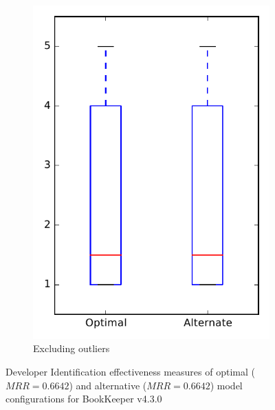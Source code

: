 \begin{figure}
\begin{subfigure}{.4\textwidth}
        \includegraphics[height=0.4\textheight]{figures/combo/dit_rq1_bookkeeper_no_outlier}
        \caption{Excluding outliers}\label{fig:combo:dit:rq1:bookkeeper_no_outlier}
    \end{subfigure}
\caption{Developer Identification effectiveness measures of optimal ($MRR=0.6642$) and alternative ($MRR=0.6642$) model configurations for BookKeeper v4.3.0}
\label{fig:combo:dit:rq1:bookkeeper}
\end{figure}
